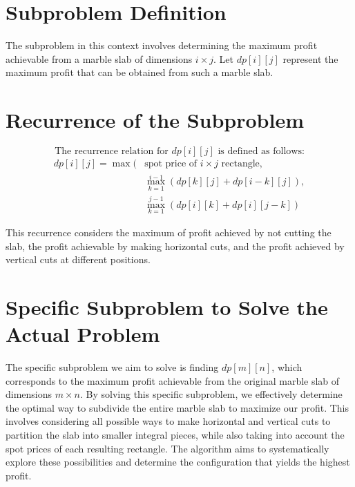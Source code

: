 \documentclass{article}
\begin{document}
\section{Subproblem Definition}
    The subproblem in this context involves determining the maximum profit achievable from a marble slab of dimensions $i \times j$. Let $dp[i][j]$ represent the maximum profit that can be obtained from such a marble slab.


\section{Recurrence of the Subproblem}

    \begin{equation*}
        \text{The recurrence relation for } dp[i][j] \text{ is defined as follows:}
    \end{equation*}
        \begin{equation*}
        \begin{aligned}
        dp[i][j] = \max(&\text{spot price of } i \times j \text{ rectangle}, \\
        &\max_{k=1}^{i-1}(dp[k][j] + dp[i-k][j]), \\
        &\max_{k=1}^{j-1}(dp[i][k] + dp[i][j-k])
    \end{aligned}
    \end{equation*}
    
    This recurrence considers the maximum of profit achieved by not cutting the slab, the profit achievable by making horizontal cuts, and the profit achieved by vertical cuts at different positions.


\section{Specific Subproblem to Solve the Actual Problem}
    The specific subproblem we aim to solve is finding $dp[m][n]$, which corresponds to the maximum profit achievable from the original marble slab of dimensions $m \times n$. By solving this specific subproblem, we effectively determine the optimal way to subdivide the entire marble slab to maximize our profit. This involves considering all possible ways to make horizontal and vertical cuts to partition the slab into smaller integral pieces, while also taking into account the spot prices of each resulting rectangle. The algorithm aims to systematically explore these possibilities and determine the configuration that yields the highest profit.
\end{document}
